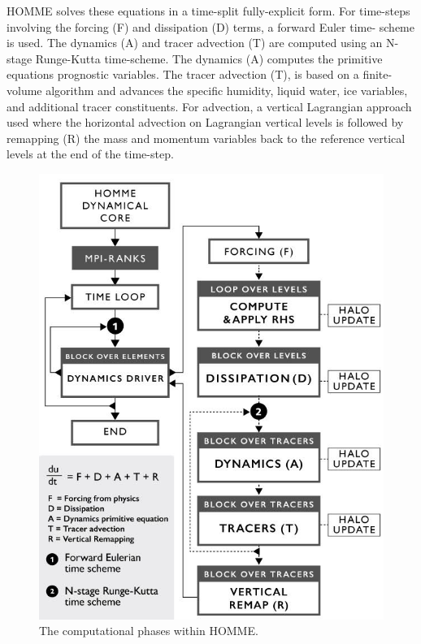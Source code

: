 HOMME solves these equations in a time-split fully-explicit form. For time-steps involving the forcing (F) and dissipation (D) terms, a forward Euler time- scheme is used. The dynamics (A) and tracer advection (T) are computed using an N-stage Runge-Kutta time-scheme. The dynamics (A) computes the primitive equations prognostic variables. The tracer advection (T), is based on a finite-volume algorithm and advances the specific humidity, liquid water, ice variables, and additional tracer constituents. For advection, a vertical Lagrangian approach used \cite{lin:2004} where the horizontal advection on Lagrangian vertical levels is followed by remapping (R) the mass and momentum variables back to the reference vertical levels at the end of the time-step.

\begin{figure}[tbp]
 \begin{center}
\includegraphics[width=12.0cm]{figures/HOMME-v00.png}
\end{center}
\caption{The computational phases within HOMME.}
\label{fig:homme-alg}
\end{figure}